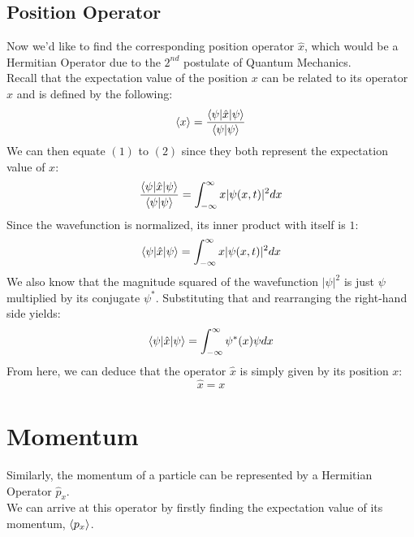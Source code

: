 \documentclass[hidelinks, a4paper, 12pt]{article}
\newcommand{\n}{\\[\baselineskip]}
\newcommand{\xhat}{\hat{x}}
\newcommand{\pxhat}{\hat{p}_x}
\begin{document}
        \subsection{Position Operator}
            Now we'd like to find the corresponding position operator $\xhat$, which would be a Hermitian Operator due to the $2^{nd}$ postulate of Quantum Mechanics.\n
            Recall that the expectation value of the position $x$ can be related to its operator $\xhat$ and is defined by the following:
            \begin{equation}
                \braket{x} = \frac{\braket{\psi | \xhat | \psi}}{\braket{\psi | \psi}}
            \end{equation}
            We can then equate $(1)$ to $(2)$ since they both represent the expectation value of $x$:
            \[\frac{\braket{\psi | \xhat | \psi}}{\braket{\psi | \psi}} = \int_{-\infty}^{\infty} x|\psi(x,t)|^2dx\]
            Since the wavefunction is normalized, its inner product with itself is $1$:
            \[\braket{\psi | \xhat | \psi} = \int_{-\infty}^{\infty} x|\psi(x,t)|^2dx\]
            We also know that the magnitude squared of the wavefunction $|\psi|^2$ is just $\psi$ multiplied by its conjugate $\psi^*$. Substituting that and rearranging the right-hand side yields:
            \[\braket{\psi | \xhat | \psi} = \int_{-\infty}^{\infty} \psi^* (x) \psi dx\]
            From here, we can deduce that the operator $\xhat$ is simply given by its position $x$:
            \[\xhat = x\]

    \section{Momentum}
        Similarly, the momentum of a particle can be represented by a Hermitian Operator $\pxhat$.\n
        We can arrive at this operator by firstly finding the expectation value of its momentum, $\braket{p_x}$.
\end{document}
